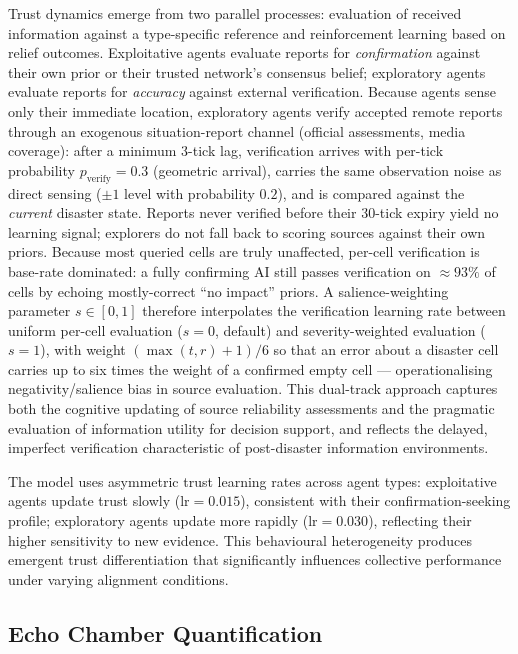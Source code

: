 Trust dynamics emerge from two parallel processes: evaluation of received
information against a type-specific reference and reinforcement learning based on
relief outcomes.
Exploitative agents evaluate reports for \emph{confirmation} against their own prior
or their trusted network's consensus belief; exploratory agents evaluate reports for
\emph{accuracy} against external verification.
Because agents sense only their immediate location, exploratory agents verify
accepted remote reports through an exogenous situation-report channel (official
assessments, media coverage): after a minimum 3-tick lag, verification arrives with
per-tick probability $p_{\mathrm{verify}}=0.3$ (geometric arrival), carries the same
observation noise as direct sensing ($\pm 1$ level with probability $0.2$), and is
compared against the \emph{current} disaster state.
Reports never verified before their 30-tick expiry yield no learning signal;
explorers do not fall back to scoring sources against their own priors.
Because most queried cells are truly unaffected, per-cell verification is
base-rate dominated: a fully confirming AI still passes verification on
$\approx 93\%$ of cells by echoing mostly-correct ``no impact'' priors.
A salience-weighting parameter $s\in[0,1]$ therefore interpolates the
verification learning rate between uniform per-cell evaluation ($s=0$, default)
and severity-weighted evaluation ($s=1$), with weight
$(\max(t, r)+1)/6$ so that an error about a disaster cell carries up to six
times the weight of a confirmed empty cell --- operationalising
negativity/salience bias in source evaluation.
This dual-track approach captures both the cognitive updating of source reliability
assessments and the pragmatic evaluation of information utility for decision support,
and reflects the delayed, imperfect verification characteristic of post-disaster
information environments.

The model uses asymmetric trust learning rates across agent types:
exploitative agents update trust slowly ($\mathrm{lr}=0.015$), consistent with
their confirmation-seeking profile; exploratory agents update more rapidly
($\mathrm{lr}=0.030$), reflecting their higher sensitivity to new evidence.
This behavioural heterogeneity produces emergent trust differentiation that
significantly influences collective performance under varying alignment conditions.

\subsection{Echo Chamber Quantification}

